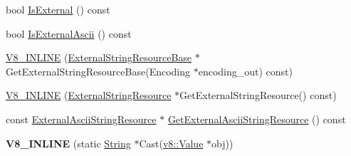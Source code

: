 \begin{DoxyCompactItemize}
\item 
bool \hyperlink{classv8_1_1_string_abbf623aabba9446cd57af14018877398}{Is\+External} () const 
\item 
bool \hyperlink{classv8_1_1_string_a470adeefeeb419860d4e069714fed42e}{Is\+External\+Ascii} () const 
\item 
\hyperlink{classv8_1_1_string_a2b70801681e8bb4cd729bb77321cc028}{V8\+\_\+\+I\+N\+L\+I\+N\+E} (\hyperlink{classv8_1_1_string_1_1_external_string_resource_base}{External\+String\+Resource\+Base} $\ast$Get\+External\+String\+Resource\+Base(Encoding $\ast$encoding\+\_\+out) const)
\item 
\hyperlink{classv8_1_1_string_a6cd3d1a90d42fbfbd723223995018447}{V8\+\_\+\+I\+N\+L\+I\+N\+E} (\hyperlink{classv8_1_1_string_1_1_external_string_resource}{External\+String\+Resource} $\ast$Get\+External\+String\+Resource() const)
\item 
const \hyperlink{classv8_1_1_string_1_1_external_ascii_string_resource}{External\+Ascii\+String\+Resource} $\ast$ \hyperlink{classv8_1_1_string_a1e6b2d33868b12e3b8fc4553b8b11d24}{Get\+External\+Ascii\+String\+Resource} () const 
\item 
\hypertarget{classv8_1_1_string_ae390706e61681df20ea8607e44e35e0f}{}{\bfseries V8\+\_\+\+I\+N\+L\+I\+N\+E} (static \hyperlink{classv8_1_1_string}{String} $\ast$Cast(\hyperlink{classv8_1_1_value}{v8\+::\+Value} $\ast$obj))\label{classv8_1_1_string_ae390706e61681df20ea8607e44e35e0f}


\end{DoxyCompactItemize}
